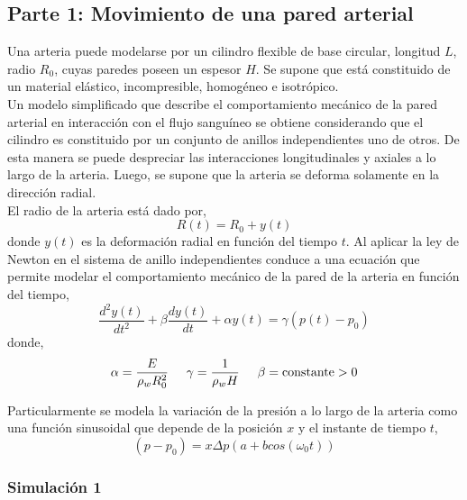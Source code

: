 
\subsection{Parte 1: Movimiento de una pared arterial}

Una arteria puede modelarse por un cilindro flexible de base circular, longitud $L$, radio $R_0$, cuyas paredes poseen un espesor $H$. Se supone que está constituido de un material elástico, incompresible, homogéneo e isotrópico. \\

Un modelo simplificado que describe el comportamiento mecánico de la pared arterial en interacción con el flujo sanguíneo se obtiene considerando que el cilindro es constituido por un conjunto de anillos independientes uno de otros. De esta manera se puede despreciar las interacciones longitudinales y axiales a lo largo de la arteria. Luego, se supone que la arteria se deforma solamente en la dirección radial. \\

El radio de la arteria está dado por,
\begin{equation}
R(t) = R_0 + y(t)
\end{equation}
donde $y(t)$ es la deformación radial en función del tiempo $t$. Al aplicar la ley de Newton en el sistema de anillo independientes conduce a una ecuación que permite modelar el comportamiento mecánico de la pared de la arteria en función del tiempo,
\begin{equation} \label{PROBLEMA_PARTE2}
\dfrac{d^2 y(t)}{dt^2} + \beta \dfrac{dy(t)}{dt} + \alpha y(t) = \gamma (p(t)-p_0)
\end{equation}
donde,
\begin{equation}
\alpha = \dfrac{E}{\rho_w R^2_0} \hspace{0,5cm} \gamma = \dfrac{1}{\rho_w H} \hspace{0,5cm} \beta = \mbox{constante} > 0 
\end{equation}

Particularmente se modela la variación de la presión a lo largo de la arteria como una función sinusoidal que depende de la posición $x$ y el instante de tiempo $t$,
\begin{equation} \label{FUENTE_PARTE2}
(p-p_0) = x \Delta p  \left( a + b cos( \omega_0 t ) \right)
\end{equation} 

\subsubsection*{Simulación 1}

